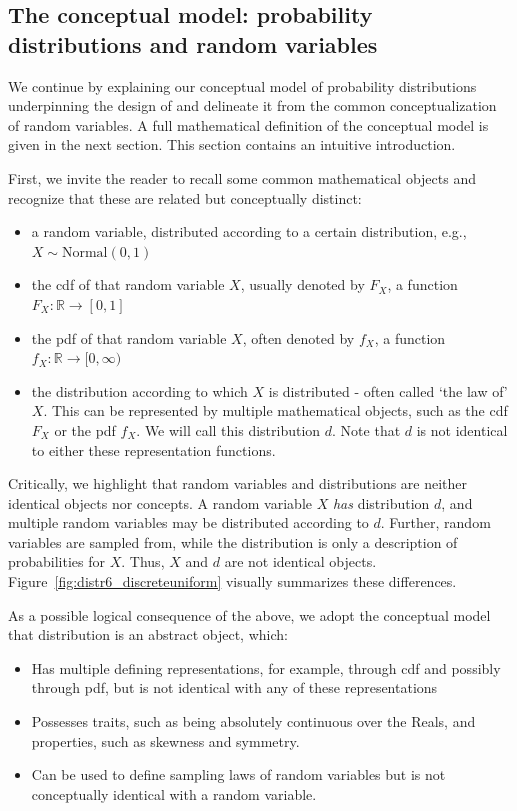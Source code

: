 \subsection{The conceptual model: probability distributions and random variables}

We continue by explaining our conceptual model of probability distributions underpinning the design of  and delineate it from the common conceptualization of random variables. A full mathematical definition of the conceptual model is given in the next section. This section contains an intuitive introduction.

First, we invite the reader to recall some common mathematical objects and recognize that these are related but conceptually distinct:
\begin{itemize}
\itemsep-0.2em
\item a random variable, distributed according to a certain distribution, e.g., $X\sim \mbox{Normal}(0,1)$
\item the cdf of that random variable $X$, usually denoted by $F_X$, a function $F_X:\mathbb{R}\rightarrow [0,1]$
\item the pdf of that random variable $X$, often denoted by $f_X$, a function $f_X:\mathbb{R}\rightarrow [0,\infty )$
\item the distribution according to which $X$ is distributed - often called `the law of' $X$. This can be represented by multiple mathematical objects, such as the cdf $F_X$ or the pdf $f_X$. We will call this distribution $d$. Note that $d$ is not identical to either these representation functions.
\end{itemize}

Critically, we highlight that random variables and distributions are neither identical objects nor concepts. A random variable $X$ \emph{has} distribution $d$, and multiple random variables may be distributed according to $d$. Further, random variables are sampled from, while the distribution is only a description of probabilities for $X$. Thus, $X$ and $d$ are not identical objects. Figure~\ref{fig:distr6_discreteuniform} visually summarizes these differences.

As a possible logical consequence of the above, we adopt the conceptual model that distribution is an abstract object, which:
\begin{itemize}
\itemsep-0.2em
\item Has multiple defining representations, for example, through cdf and possibly through pdf, but is not identical with any of these representations
\item Possesses traits, such as being absolutely continuous over the Reals, and properties, such as skewness and symmetry.
\item Can be used to define sampling laws of random variables but is not conceptually identical with a random variable.
\end{itemize}


